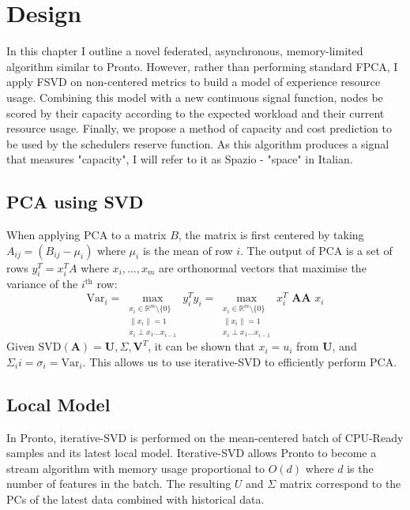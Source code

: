 \chapter{Design}

In this chapter I outline a novel federated, asynchronous, memory-limited
algorithm similar to Pronto. However, rather than performing standard FPCA, I
apply FSVD on non-centered metrics to build a model of experience resource
usage. Combining this model with a new continuous signal function, nodes be
scored by their capacity according to the expected workload and their current
resource usage. Finally, we propose a method of capacity and cost prediction to
be used by the schedulers reserve function. As this algorithm produces a signal
that measures "capacity", I will refer to it as Spazio - "space" in Italian.

\section{PCA using SVD}
When applying PCA to a matrix $B$, the matrix is first centered by taking
$A_{ij} = (B_{ij} - \mu_i)$ where $\mu_i$ is the mean of row $i$. The output of
PCA is a set of rows $y_i^T = x_i^TA$ where $x_i,...,x_m$ are orthonormal
vectors that maximise the variance of the $i^{\text{th}}$ row:
\[ \text{Var}_i = \max_{\substack{x_i \in \mathbb{R}^m \setminus \{ 0\} \\
\|x_i\| = 1 \\ x_i \perp x_1 \ldots x_{i-1}}} y_i^T y_i = \max_{\substack{x_i
\in \mathbb{R}^m\setminus \{ 0\} \\ \|x_i\| = 1 \\ x_i \perp x_1 \ldots
x_{i-1}}} x_i^T \textbf{ AA } x_i \]
Given $\text{SVD}(\textbf{A}) = \textbf{U}, \Sigma, \textbf{V}^T$, it can be
shown that $x_i = u_i$ from $\textbf{U}$, and $\Sigma_ii = \sigma_i =
\text{Var}_i$. This allows us to use iterative-SVD to efficiently perform PCA.

\section{Local Model}
\label{sec:local-model-construction}
In Pronto, iterative-SVD is performed on the mean-centered batch of CPU-Ready
samples and its latest local model. Iterative-SVD allows Pronto to become a
stream algorithm with memory usage proportional to $O(d)$ where $d$ is the
number of features in the batch. The resulting $U$ and $\Sigma$ matrix
correspond to the PCs of the latest data combined with historical data.

